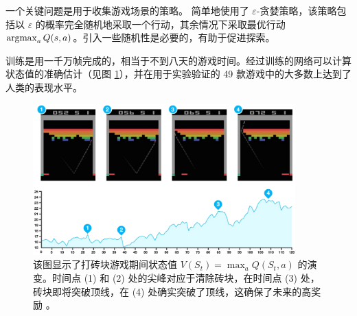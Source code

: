 一个关键问题是用于收集游戏场景的策略。\cite{nature14236} 简单地使用了 $\varepsilon$-贪婪策略，该策略包括以 $\varepsilon$ 的概率完全随机地采取一个行动，其余情况下采取最优行动 $\argmax_aQ(s,a)$。引入一些随机性是必要的，有助于促进探索。

训练是用一千万帧完成的，相当于不到八天的游戏时间。经过训练的网络可以计算状态值的准确估计（见图 \ref{fig6.5}），并在用于实验验证的 49 款游戏中的大多数上达到了人类的表现水平。

\begin{figure}
    \centering
    \includegraphics[width=0.9\textwidth]{fig/fig6.5.png}
    \caption[DQN 状态值演化]{该图显示了打砖块游戏期间状态值 $V(S_t)=\max_aQ(S_t,a)$ 的演变。时间点 (1) 和 (2) 处的尖峰对应于清除砖块，在时间点 (3) 处，砖块即将突破顶线，在 (4) 处确实突破了顶线，这确保了未来的高奖励 \citep{nature14236}。}
    \label{fig6.5}
\end{figure}